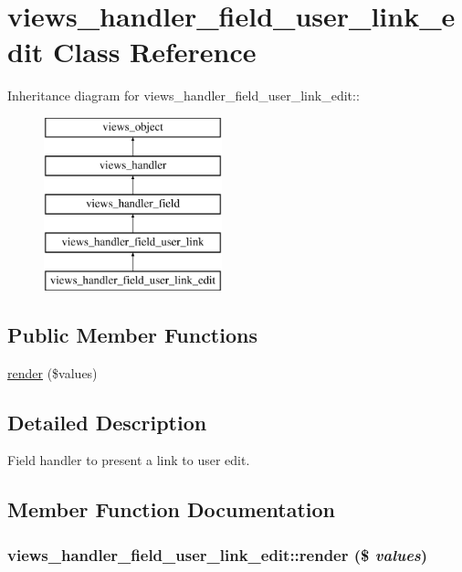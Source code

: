 \hypertarget{classviews__handler__field__user__link__edit}{
\section{views\_\-handler\_\-field\_\-user\_\-link\_\-edit Class Reference}
\label{classviews__handler__field__user__link__edit}
}
Inheritance diagram for views\_\-handler\_\-field\_\-user\_\-link\_\-edit::\begin{figure}[H]
\begin{center}
\leavevmode
\includegraphics[height=5cm]{classviews__handler__field__user__link__edit}
\end{center}
\end{figure}
\subsection*{Public Member Functions}
\begin{CompactItemize}
\item 
\hyperlink{classviews__handler__field__user__link__edit_e52836f8117074b005527bf60e4f536a}{render} (\$values)
\end{CompactItemize}


\subsection{Detailed Description}
Field handler to present a link to user edit. 

\subsection{Member Function Documentation}
\hypertarget{classviews__handler__field__user__link__edit_e52836f8117074b005527bf60e4f536a}{
\subsubsection[{render}]{\setlength{\rightskip}{0pt plus 5cm}views\_\-handler\_\-field\_\-user\_\-link\_\-edit::render (\$ {\em values})}}
\label{classviews__handler__field__user__link__edit_e52836f8117074b005527bf60e4f536a}


